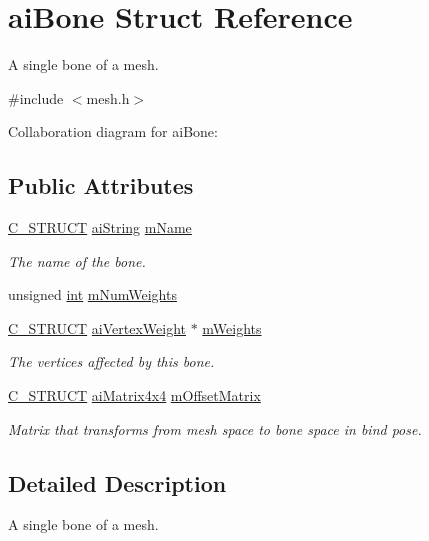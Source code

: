 \hypertarget{structai_bone}{\section{ai\-Bone Struct Reference}
\label{structai_bone}
}


A single bone of a mesh.  




{\ttfamily \#include $<$mesh.\-h$>$}



Collaboration diagram for ai\-Bone\-:
\subsection*{Public Attributes}
\begin{DoxyCompactItemize}
\item 
\hyperlink{defs_8h_ab51df4230ceb602bbc1bc109c432a6a0}{C\-\_\-\-S\-T\-R\-U\-C\-T} \hyperlink{structai_string}{ai\-String} \hyperlink{structai_bone_acfb9bfd2a2c6302181d7c3cc1bb8bbf0}{m\-Name}
\begin{DoxyCompactList}\small\item\em The name of the bone. \end{DoxyCompactList}\item 
unsigned \hyperlink{_s_d_l__thread_8h_a6a64f9be4433e4de6e2f2f548cf3c08e}{int} \hyperlink{structai_bone_a87a79d42a0132753aac66397ad6f9b71}{m\-Num\-Weights}
\item 
\hyperlink{defs_8h_ab51df4230ceb602bbc1bc109c432a6a0}{C\-\_\-\-S\-T\-R\-U\-C\-T} \hyperlink{structai_vertex_weight}{ai\-Vertex\-Weight} $\ast$ \hyperlink{structai_bone_ade36319714b58c03ad46aae30a2724a4}{m\-Weights}
\begin{DoxyCompactList}\small\item\em The vertices affected by this bone. \end{DoxyCompactList}\item 
\hyperlink{defs_8h_ab51df4230ceb602bbc1bc109c432a6a0}{C\-\_\-\-S\-T\-R\-U\-C\-T} \hyperlink{structai_matrix4x4}{ai\-Matrix4x4} \hyperlink{structai_bone_a1dd6c4f24a1384c05da281692be3e78d}{m\-Offset\-Matrix}
\begin{DoxyCompactList}\small\item\em Matrix that transforms from mesh space to bone space in bind pose. \end{DoxyCompactList}\end{DoxyCompactItemize}


\subsection{Detailed Description}
A single bone of a mesh. 

